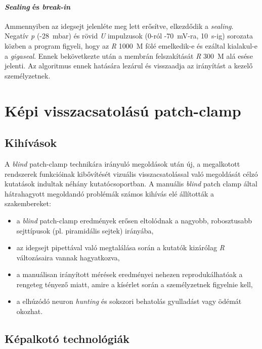 \documentclass[12pt,a4paper]{report}
\begin{document}
\paragraph*{\textit{Sealing} és \textit{break-in}}
Ammennyiben az idegsejt jelenléte meg lett erősítve, elkezdődik a \textit{sealing}. Negatív \textit{p} (-28~mbar) és rövid \textit{U} impulzusok (0-ról -70~mV-ra, 10~s-ig) sorozata közben a program figyeli, hogy az \textit{R} 1000~M\textOmega{} fölé emelkedik-e és ezáltal kialakul-e a \textit{gigaseal}. Ennek bekövetkezte után a membrán felszakítását \textit{R} 300~M\textOmega{} alá esése jelenti. Az algoritmus ennek hatására lezárul és visszaadja az irányítást a kezelő személyzetnek.

\section*{Képi visszacsatolású patch-clamp}

\subsection*{Kihívások}
A \textit{blind} patch-clamp technikára irányuló megoldások után új, a megalkotott rendszerek funkcióinak kibővítését vizuális visszacsatolással való megoldását célzó kutatások indultak néhány kutatócsoportban. A manuális \textit{blind} patch clamp által hátrahagyott megoldandó problémák számos kihívás elé állították a szakembereket: 
\begin{itemize}
    \item a \textit{blind} patch-clamp eredmények erősen eltolódnak a nagyobb, robosztusabb sejttípusok (pl. piramidális sejtek) irányába,
    \item az idegsejt pipettával való megtalálása során a kutatók kizárólag \textit{R} változásaira vannak hagyatkozva,
    \item a manuálisan irányított mérések eredményei nehezen reprodukálhatóak a rengeteg tényező miatt, amire a kísérlet során a személyzetnek figyelnie kell,
    \item a elhúzódó neuron \textit{hunting} és sokszori behatolás gyulladást vagy ödémát okozhat.
\end{itemize}

\subsection*{Képalkotó technológiák}
\end{document}
